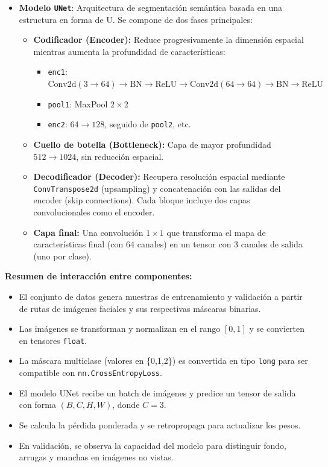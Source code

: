 \begin{enumerate}
\begin{itemize}
\begin{itemize}
    \item \textbf{Modelo \texttt{UNet}}: Arquitectura de segmentación semántica basada en una estructura en forma de U. Se compone de dos fases principales:
    \begin{itemize}
        \item \textbf{Codificador (Encoder):} Reduce progresivamente la dimensión espacial mientras aumenta la profundidad de características:
        \begin{itemize}
            \item \texttt{enc1}: \( \text{Conv2d}(3 \rightarrow 64) \rightarrow \text{BN} \rightarrow \text{ReLU} \rightarrow \text{Conv2d}(64 \rightarrow 64) \rightarrow \text{BN} \rightarrow \text{ReLU} \)
            \item \texttt{pool1}: MaxPool \(2 \times 2\)
            \item \texttt{enc2}: \(64 \rightarrow 128\), seguido de \texttt{pool2}, etc.
        \end{itemize}
        \item \textbf{Cuello de botella (Bottleneck):} Capa de mayor profundidad \(512 \rightarrow 1024\), sin reducción espacial.
        \item \textbf{Decodificador (Decoder):} Recupera resolución espacial mediante \texttt{ConvTranspose2d} (upsampling) y concatenación con las salidas del encoder (skip connections). Cada bloque incluye dos capas convolucionales como el encoder.
        \item \textbf{Capa final:} Una convolución \(1 \times 1\) que transforma el mapa de características final (con 64 canales) en un tensor con 3 canales de salida (uno por clase).
    \end{itemize}
\end{itemize}
\end{itemize}

\vspace{1em}
\textbf{Resumen de interacción entre componentes:}

\begin{itemize}
    \item El conjunto de datos genera muestras de entrenamiento y validación a partir de rutas de imágenes faciales y sus respectivas máscaras binarias.
    \item Las imágenes se transforman y normalizan en el rango \([0, 1]\) y se convierten en tensores \texttt{float}.
    \item La máscara multiclase (valores en \{0,1,2\}) es convertida en tipo \texttt{long} para ser compatible con \texttt{nn.CrossEntropyLoss}.
    \item El modelo UNet recibe un batch de imágenes y predice un tensor de salida con forma \((B, C, H, W)\), donde \(C = 3\).
    \item Se calcula la pérdida ponderada y se retropropaga para actualizar los pesos.
    \item En validación, se observa la capacidad del modelo para distinguir fondo, arrugas y manchas en imágenes no vistas.
\end{itemize}



\end{enumerate}
